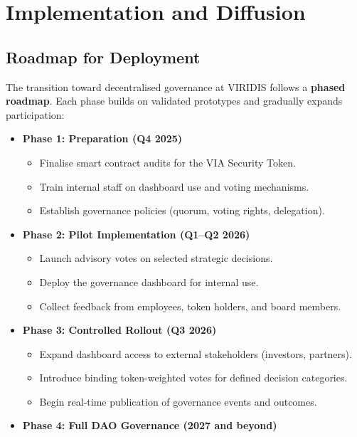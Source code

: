 \documentclass[
  english,
  12pt,
  oneside,
  open=any]{scrbook}
\providecommand{\tightlist}{%
  \setlength{\itemsep}{0pt}\setlength{\parskip}{0pt}}\usepackage{longtable,booktabs,array}
\begin{document}
\chapter{Implementation and Diffusion}\label{sec-implementation}

\section{Roadmap for Deployment}\label{sec-roadmap}

The transition toward decentralised governance at VIRIDIS follows a
\textbf{phased roadmap}. Each phase builds on validated prototypes and
gradually expands participation:

\begin{itemize}
\tightlist
\item
  \textbf{Phase 1: Preparation (Q4 2025)}

  \begin{itemize}
  \tightlist
  \item
    Finalise smart contract audits for the VIA Security Token.\\
  \item
    Train internal staff on dashboard use and voting mechanisms.\\
  \item
    Establish governance policies (quorum, voting rights, delegation).
  \end{itemize}
\item
  \textbf{Phase 2: Pilot Implementation (Q1--Q2 2026)}

  \begin{itemize}
  \tightlist
  \item
    Launch advisory votes on selected strategic decisions.\\
  \item
    Deploy the governance dashboard for internal use.\\
  \item
    Collect feedback from employees, token holders, and board members.
  \end{itemize}
\item
  \textbf{Phase 3: Controlled Rollout (Q3 2026)}

  \begin{itemize}
  \tightlist
  \item
    Expand dashboard access to external stakeholders (investors,
    partners).\\
  \item
    Introduce binding token-weighted votes for defined decision
    categories.\\
  \item
    Begin real-time publication of governance events and outcomes.
  \end{itemize}
\item
  \textbf{Phase 4: Full DAO Governance (2027 and beyond)}


\end{itemize}
\end{document}
